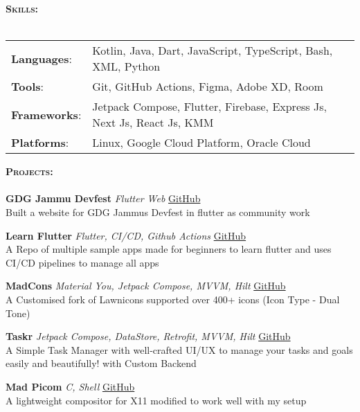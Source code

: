 \documentclass[a4paper]{article}
\newcommand{\lineunder} {
    \vspace*{-8pt} \\
    \hspace*{-18pt} \hrulefill \\
}
\newcommand{\header} [1] {
    {\hspace*{-18pt}\vspace*{6pt} \textsc{#1} }
    \vspace*{-6pt} \lineunder
}
\begin{document}
\header{\textbf{Skills:}}
\begin{tabular}{ l l }
	{\textbf{Languages}}:  
        & Kotlin, Java, Dart, JavaScript, TypeScript, Bash, XML, Python          \\
	{\textbf{Tools}}:   
        & Git, GitHub Actions, Figma, Adobe XD, Room            \\
	{\textbf{Frameworks}}:
        & Jetpack Compose, Flutter, Firebase, Express Js, Next Js, React Js, KMM \\
	{\textbf{Platforms}}: 
        & Linux, Google Cloud Platform, Oracle Cloud                             \\
\end{tabular}
\vspace{2mm}

\header{ \textbf{Projects:}}
{\textbf{GDG Jammu Devfest}} {\sl Flutter Web}
    \hfill \href{https://github.com/GDG-Jammu}{GitHub}\\
    Built a website for GDG Jammu\textquotesingle{}s Devfest in flutter as community work\\
\vspace*{2mm}

{\textbf{Learn Flutter}} {\sl Flutter, CI/CD, Github Actions} 
    \hfill \href{https://github.com/MadFlasheroo7/Learn-Flutter}{GitHub}\\
    A Repo of multiple sample apps made for beginners to learn flutter and uses CI/CD pipelines to manage all apps\\
\vspace*{2mm}

{\textbf{MadCons}} {\sl Material You, Jetpack Compose, MVVM, Hilt} 
    \hfill \href{https://github.com/MadFlasheroo7/madcons}{GitHub}\\
    A Customised fork of Lawnicons supported over 400+ icons (Icon Type - Dual Tone)\\
\vspace*{2mm}

{\textbf{Taskr}} {\sl Jetpack Compose, DataStore, Retrofit, MVVM, Hilt} 
    \hfill \href{https://github.com/taskr-org}{GitHub}\\
    A Simple Task Manager with well-crafted UI/UX to manage your tasks and goals easily and beautifully! with Custom Backend\\
\vspace*{2mm}

{\textbf{Mad Picom}} {\sl C, Shell} 
    \hfill \href{https://github.com/MadFlasheroo7/mad-picom}{GitHub}\\
    A lightweight compositor for X11 modified to work well with my setup\\
\vspace*{2mm}
\end{document}

